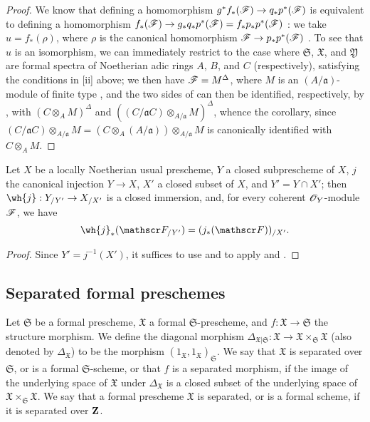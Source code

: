 \begin{proof}
\label{proof-1.10.14.6}
We know that defining a homomorphism $g^*f_*(\sh{F}) \to q_*p^*(\sh{F})$ is equivalent to defining a homomorphism $f_*(\sh{F}) \to g_*q_*p^*(\sh{F}) = f_*p_*p^*(\sh{F})$ :
we take $u=f_*(\rho)$, where $\rho$ is the canonical homomorphism $\sh{F}\to p_*p^*(\sh{F})$ .
To see that $u$ is an isomorphism, we can immediately restrict to the case where $\mathfrak{S}$, $\mathfrak{X}$, and $\mathfrak{Y}$ are formal spectra of Noetherian adic rings $A$, $B$, and $C$ (respectively), satisfying the conditions in [ii] above;
we then have $\mathscr{F}=M^\Delta$, where $M$ is an $(A/\mathfrak{a})$-module of finite type , and the two sides of  can then be identified, respectively, by , with $(C\otimes_A M)^\Delta$ and $((C/\mathfrak{a}C)\otimes_{A/\mathfrak{a}}M)^\Delta$, whence the corollary, since $(C/\mathfrak{a}C)\otimes_{A/\mathfrak{a}}M = (C\otimes_A(A/\mathfrak{a}))\otimes_{A/\mathfrak{a}}M$ is canonically identified with $C\otimes_A M$.
\end{proof}

\begin{corollary}[10.14.7]
\label{1.10.14.7}
Let $X$ be a locally Noetherian usual prescheme, $Y$ a closed subprescheme of $X$, $j$ the canonical injection $Y\to X$, $X'$ a closed subset of $X$, and $Y'=Y\cap X'$;
then $\wh{j}:Y_{/Y'}\to X_{/X'}$ is a closed immersion, and, for every coherent $\mathscr{O}_Y$-module $\mathscr{F}$, we have
\[
    \wh{j}_*(\sh{F}_{/Y'}) = (j_*(\sh{F}))_{/X'}.
\]
\end{corollary}

\begin{proof}
\label{proof-1.10.14.7}
Since $Y'=j^{-1}(X')$, it suffices to use  and to apply  and .
\end{proof}

\subsection{Separated formal preschemes}
\label{subsection:1.10.15}

\begin{definition}[10.15.1]
\label{1.10.15.1}
Let $\mathfrak{S}$ be a formal prescheme, $\mathfrak{X}$ a formal $\mathfrak{S}$-prescheme, and $f:\mathfrak{X}\to\mathfrak{S}$ the structure morphism.
We define the diagonal morphism $\Delta_{\mathfrak{X}|\mathfrak{S}}:\mathfrak{X}\to\mathfrak{X}\times_\mathfrak{S}\mathfrak{X}$ (also denoted by $\Delta_\mathfrak{X}$) to be the morphism $(1_\mathfrak{X},1_\mathfrak{X})_\mathfrak{S}$.
We say that $\mathfrak{X}$ is separated over $\mathfrak{S}$, or is a formal $\mathfrak{S}$-scheme, or that $f$ is a separated morphism, if the image of the underlying space of $\mathfrak{X}$ under $\Delta_\mathfrak{X}$ is a closed subset of the underlying space of $\mathfrak{X}\times_\mathfrak{S}\mathfrak{X}$.
We say that a formal prescheme $\mathfrak{X}$ is separated, or is a formal scheme, if it is separated over $\mathbf{Z}$.
\end{definition}

